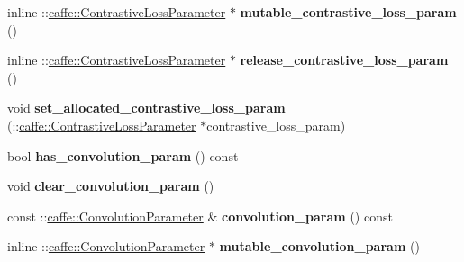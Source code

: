 \begin{DoxyCompactItemize}
\item 
\mbox{\label{classcaffe_1_1_v1_layer_parameter_a46d62af6d1cd1b4b83abd625b93db250}} 
inline \+::\mbox{\hyperlink{classcaffe_1_1_contrastive_loss_parameter}{caffe\+::\+Contrastive\+Loss\+Parameter}} $\ast$ {\bfseries mutable\+\_\+contrastive\+\_\+loss\+\_\+param} ()
\item 
\mbox{\label{classcaffe_1_1_v1_layer_parameter_a2dbbca3383cabf98d9db960a0a9760a0}} 
inline \+::\mbox{\hyperlink{classcaffe_1_1_contrastive_loss_parameter}{caffe\+::\+Contrastive\+Loss\+Parameter}} $\ast$ {\bfseries release\+\_\+contrastive\+\_\+loss\+\_\+param} ()
\item 
\mbox{\label{classcaffe_1_1_v1_layer_parameter_a545e3324f21356f2cd57ea59c20a92cf}} 
void {\bfseries set\+\_\+allocated\+\_\+contrastive\+\_\+loss\+\_\+param} (\+::\mbox{\hyperlink{classcaffe_1_1_contrastive_loss_parameter}{caffe\+::\+Contrastive\+Loss\+Parameter}} $\ast$contrastive\+\_\+loss\+\_\+param)
\item 
\mbox{\label{classcaffe_1_1_v1_layer_parameter_a94e80b83012bb83bc6abd0dfad2d1fc6}} 
bool {\bfseries has\+\_\+convolution\+\_\+param} () const
\item 
\mbox{\label{classcaffe_1_1_v1_layer_parameter_a1555215b5d7caea094079081b8d0ee6a}} 
void {\bfseries clear\+\_\+convolution\+\_\+param} ()
\item 
\mbox{\label{classcaffe_1_1_v1_layer_parameter_ae6fd67083a1561dd76f33bee5fa5dc1b}} 
const \+::\mbox{\hyperlink{classcaffe_1_1_convolution_parameter}{caffe\+::\+Convolution\+Parameter}} \& {\bfseries convolution\+\_\+param} () const
\item 
\mbox{\label{classcaffe_1_1_v1_layer_parameter_a672289c8c7ac3f6f8054b84acc33530f}} 
inline \+::\mbox{\hyperlink{classcaffe_1_1_convolution_parameter}{caffe\+::\+Convolution\+Parameter}} $\ast$ {\bfseries mutable\+\_\+convolution\+\_\+param} ()
\item 
\mbox{\label{classcaffe_1_1_v1_layer_parameter_aac300f0f9a3c9685fe62bf53270fbdb5}} 

\end{DoxyCompactItemize}
